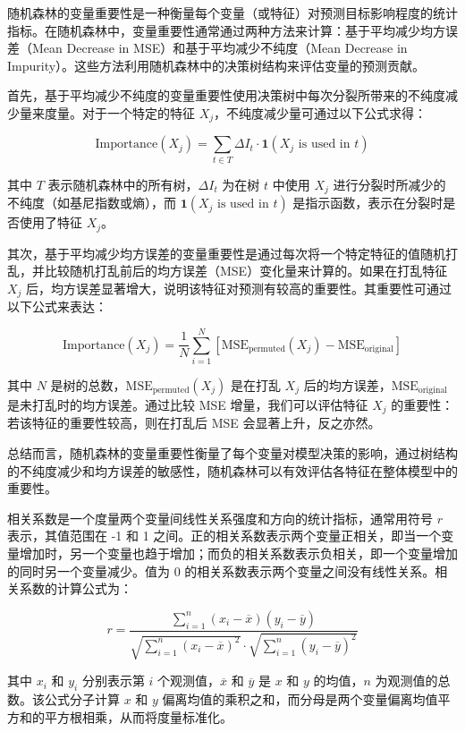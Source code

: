 \documentclass[AutoFakeBold]{LZUThesis-PgD&PhD}
\begin{document}
	随机森林的变量重要性是一种衡量每个变量（或特征）对预测目标影响程度的统计指标。在随机森林中，变量重要性通常通过两种方法来计算：基于平均减少均方误差（Mean Decrease in MSE）和基于平均减少不纯度（Mean Decrease in Impurity）。这些方法利用随机森林中的决策树结构来评估变量的预测贡献。
	
	首先，基于平均减少不纯度的变量重要性使用决策树中每次分裂所带来的不纯度减少量来度量。对于一个特定的特征 \( X_j \)，不纯度减少量可通过以下公式求得：
	
	\[
	\text{Importance}(X_j) = \sum_{t \in T} \Delta I_t \cdot \mathbf{1}(X_j \text{ is used in } t)
	\]
	
	其中 \( T \) 表示随机森林中的所有树，\( \Delta I_t \) 为在树 \( t \) 中使用 \( X_j \) 进行分裂时所减少的不纯度（如基尼指数或熵），而 \( \mathbf{1}(X_j \text{ is used in } t) \) 是指示函数，表示在分裂时是否使用了特征 \( X_j \)。
	
	其次，基于平均减少均方误差的变量重要性是通过每次将一个特定特征的值随机打乱，并比较随机打乱前后的均方误差（MSE）变化量来计算的。如果在打乱特征 \( X_j \) 后，均方误差显著增大，说明该特征对预测有较高的重要性。其重要性可通过以下公式来表达：
	
	\[
	\text{Importance}(X_j) = \frac{1}{N} \sum_{i=1}^{N} \left[ \text{MSE}_{\text{permuted}}(X_j) - \text{MSE}_{\text{original}} \right]
	\]
	
	其中 \( N \) 是树的总数，\( \text{MSE}_{\text{permuted}}(X_j) \) 是在打乱 \( X_j \) 后的均方误差，\( \text{MSE}_{\text{original}} \) 是未打乱时的均方误差。通过比较 MSE 增量，我们可以评估特征 \( X_j \) 的重要性：若该特征的重要性较高，则在打乱后 MSE 会显著上升，反之亦然。
	
	总结而言，随机森林的变量重要性衡量了每个变量对模型决策的影响，通过树结构的不纯度减少和均方误差的敏感性，随机森林可以有效评估各特征在整体模型中的重要性。
	
	相关系数是一个度量两个变量间线性关系强度和方向的统计指标，通常用符号 \( r \) 表示，其值范围在 -1 和 1 之间。正的相关系数表示两个变量正相关，即当一个变量增加时，另一个变量也趋于增加；而负的相关系数表示负相关，即一个变量增加的同时另一个变量减少。值为 0 的相关系数表示两个变量之间没有线性关系。相关系数的计算公式为：
	
	\[
	r = \frac{\sum_{i=1}^{n} (x_i - \overline{x})(y_i - \overline{y})}{\sqrt{\sum_{i=1}^{n} (x_i - \overline{x})^2} \cdot \sqrt{\sum_{i=1}^{n} (y_i - \overline{y})^2}}
	\]
	
	其中 \( x_i \) 和 \( y_i \) 分别表示第 \( i \) 个观测值，\( \overline{x} \) 和 \( \overline{y} \) 是 \( x \) 和 \( y \) 的均值，\( n \) 为观测值的总数。该公式分子计算 \( x \) 和 \( y \) 偏离均值的乘积之和，而分母是两个变量偏离均值平方和的平方根相乘，从而将度量标准化。
	
\end{document}
